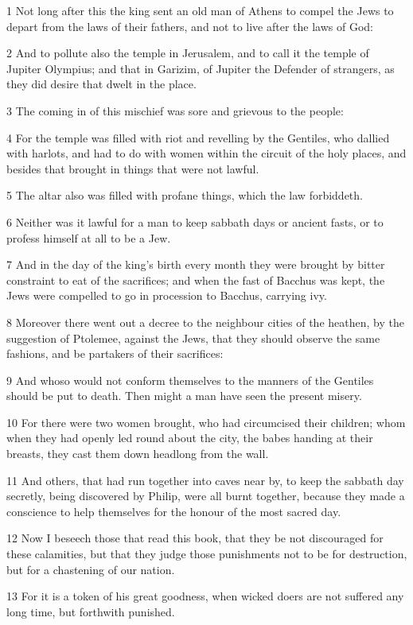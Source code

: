\par 1 Not long after this the king sent an old man of Athens to compel the Jews to depart from the laws of their fathers, and not to live after the laws of God:
\par 2 And to pollute also the temple in Jerusalem, and to call it the temple of Jupiter Olympius; and that in Garizim, of Jupiter the Defender of strangers, as they did desire that dwelt in the place.
\par 3 The coming in of this mischief was sore and grievous to the people:
\par 4 For the temple was filled with riot and revelling by the Gentiles, who dallied with harlots, and had to do with women within the circuit of the holy places, and besides that brought in things that were not lawful.
\par 5 The altar also was filled with profane things, which the law forbiddeth.
\par 6 Neither was it lawful for a man to keep sabbath days or ancient fasts, or to profess himself at all to be a Jew.
\par 7 And in the day of the king's birth every month they were brought by bitter constraint to eat of the sacrifices; and when the fast of Bacchus was kept, the Jews were compelled to go in procession to Bacchus, carrying ivy.
\par 8 Moreover there went out a decree to the neighbour cities of the heathen, by the suggestion of Ptolemee, against the Jews, that they should observe the same fashions, and be partakers of their sacrifices:
\par 9 And whoso would not conform themselves to the manners of the Gentiles should be put to death. Then might a man have seen the present misery.
\par 10 For there were two women brought, who had circumcised their children; whom when they had openly led round about the city, the babes handing at their breasts, they cast them down headlong from the wall.
\par 11 And others, that had run together into caves near by, to keep the sabbath day secretly, being discovered by Philip, were all burnt together, because they made a conscience to help themselves for the honour of the most sacred day.
\par 12 Now I beseech those that read this book, that they be not discouraged for these calamities, but that they judge those punishments not to be for destruction, but for a chastening of our nation.
\par 13 For it is a token of his great goodness, when wicked doers are not suffered any long time, but forthwith punished.
